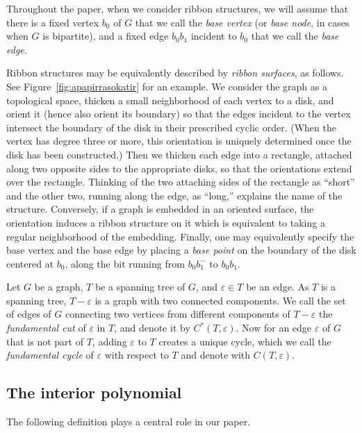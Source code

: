 \documentclass[ALCO,ThmDefs,Unicode,epreuves]{cedram}
\begin{document}
Throughout the paper, when we consider ribbon structures, we will assume that there is a fixed vertex $b_0$ of $G$ that we call the \emph{base vertex} (or \emph{base node}, in cases when $G$ is bipartite), and a fixed edge $b_0b_1$ incident to $b_0$ that we call the \emph{base edge}. 

\begin{rema}
\label{rem:surface}
Ribbon structures may be equivalently described by \emph{ribbon surfaces}, as follows. See Figure~\ref{fig:apapirrasokatir} for an example. We consider the graph as a topological space, thicken a small neighborhood of each vertex to a disk, and orient it (hence also orient its boundary) so that the edges incident to the vertex intersect the boundary of the disk in their prescribed cyclic order. (When the vertex has degree three or more, this orientation is uniquely determined once the disk has been constructed.) Then we thicken each edge into a rectangle, attached along two opposite sides to the appropriate disks, so that the orientations extend over the rectangle. Thinking of the two attaching sides of the rectangle as ``short'' and the other two, running along the edge, as ``long,'' explains the name of the structure. Conversely, if a graph is embedded in an oriented surface, the orientation induces a ribbon structure on it which is equivalent to taking a regular neighborhood of the embedding. Finally, one may equivalently specify the base vertex and the base edge by placing a \emph{base point} on the boundary of the disk centered at $b_0$, along the bit running from $b_0b_1^-$ to $b_0b_1$.
\end{rema}

Let $G$ be a graph, $T$ be a spanning tree of $G$, and $\varepsilon\in T$ be an edge. As $T$ is a spanning tree, $T-\varepsilon$ is a graph with two connected components. We call the set of edges of $G$ connecting two vertices from different components of $T-\varepsilon$ the \emph{fundamental cut} of $\varepsilon$ in $T$, and denote it by $C^*(T,\varepsilon)$. Now for an edge $\varepsilon$ of $G$ that is not part of $T$, adding $\varepsilon$ to $T$ creates a unique cycle, which we call the \emph{fundamental cycle} of $\varepsilon$ with respect to $T$ and denote with $C(T,\varepsilon)$.


\subsection{The interior polynomial}
\label{ssec:interior}

The following definition plays a central role in our paper. 
\end{document}

